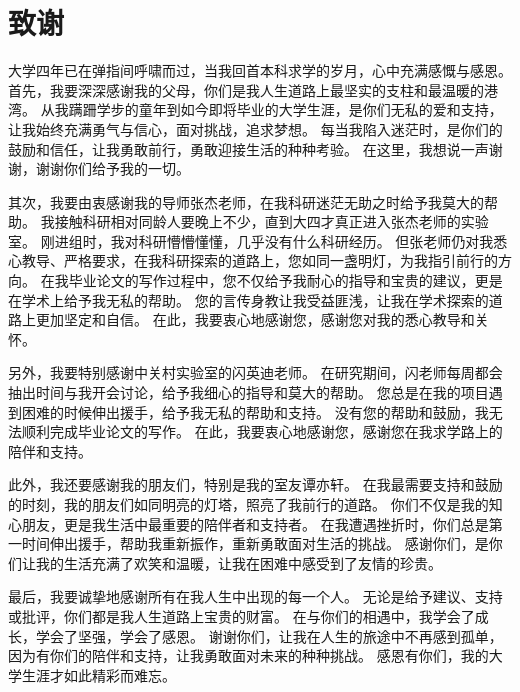 
\chapter{致谢}
大学四年已在弹指间呼啸而过，当我回首本科求学的岁月，心中充满感慨与感恩。
首先，我要深深感谢我的父母，你们是我人生道路上最坚实的支柱和最温暖的港湾。
从我蹒跚学步的童年到如今即将毕业的大学生涯，是你们无私的爱和支持，让我始终充满勇气与信心，面对挑战，追求梦想。
每当我陷入迷茫时，是你们的鼓励和信任，让我勇敢前行，勇敢迎接生活的种种考验。
在这里，我想说一声谢谢，谢谢你们给予我的一切。

其次，我要由衷感谢我的导师张杰老师，在我科研迷茫无助之时给予我莫大的帮助。
我接触科研相对同龄人要晚上不少，直到大四才真正进入张杰老师的实验室。
刚进组时，我对科研懵懵懂懂，几乎没有什么科研经历。
但张老师仍对我悉心教导、严格要求，在我科研探索的道路上，您如同一盏明灯，为我指引前行的方向。
在我毕业论文的写作过程中，您不仅给予我耐心的指导和宝贵的建议，更是在学术上给予我无私的帮助。
您的言传身教让我受益匪浅，让我在学术探索的道路上更加坚定和自信。
在此，我要衷心地感谢您，感谢您对我的悉心教导和关怀。

另外，我要特别感谢中关村实验室的闪英迪老师。
在研究期间，闪老师每周都会抽出时间与我开会讨论，给予我细心的指导和莫大的帮助。
您总是在我的项目遇到困难的时候伸出援手，给予我无私的帮助和支持。
没有您的帮助和鼓励，我无法顺利完成毕业论文的写作。
在此，我要衷心地感谢您，感谢您在我求学路上的陪伴和支持。

此外，我还要感谢我的朋友们，特别是我的室友谭亦轩。
在我最需要支持和鼓励的时刻，我的朋友们如同明亮的灯塔，照亮了我前行的道路。
你们不仅是我的知心朋友，更是我生活中最重要的陪伴者和支持者。
在我遭遇挫折时，你们总是第一时间伸出援手，帮助我重新振作，重新勇敢面对生活的挑战。
感谢你们，是你们让我的生活充满了欢笑和温暖，让我在困难中感受到了友情的珍贵。

最后，我要诚挚地感谢所有在我人生中出现的每一个人。
无论是给予建议、支持或批评，你们都是我人生道路上宝贵的财富。
在与你们的相遇中，我学会了成长，学会了坚强，学会了感恩。
谢谢你们，让我在人生的旅途中不再感到孤单，因为有你们的陪伴和支持，让我勇敢面对未来的种种挑战。
感恩有你们，我的大学生涯才如此精彩而难忘。

